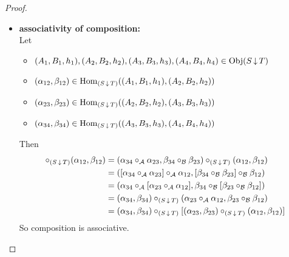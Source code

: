 \documentclass{book}
\begin{document}
\begin{proof}
\begin{itemize}
\begin{align*}
				& = h_3 \circ_{\MC} (S(\al_{23}) \circ_{\MC} S(\al_{12})) \\
				& = h_3 \circ_{\MC} S(\al_{23} \circ_{\MA} \al_{12})
			\end{align*}
			i.e. the following diagram commutes:
			\[ 
			\begin{tikzcd}
				S(A_1) \arrow[rr, "S(\al_{23} \circ_{\MA} \al_{12})"] \arrow[d, "h_1"']&  & S(A_3)  \arrow[d, "h_3"] \\
				T(B_1) \arrow[rr, "T(\be_{23} \circ_{\MB} \be_{12})"']                       &  & T(B_3)
			\end{tikzcd}
			\]
			Hence $(\al_{23} \circ_{\MA} \al_{12}, \be_{23} \circ_{\MB} \be_{12}) \in \Hom_{(S \doar T)}((A_1, B_1, h_1), (A_3, B_3, h_3))$ and composition is well defined. \\
			\item \textbf{associativity of composition:} \\
			Let 
			\begin{itemize}
				\item $(A_1, B_1, h_1), (A_2, B_2, h_2), (A_3, B_3, h_3), (A_4, B_4, h_4) \in \operatorname{Obj}(S \operatorname{\downarrow} T)$
				\item $(\alpha_{12}, \beta_{12}) \in \operatorname{Hom}_{(S \operatorname{\downarrow} T)}((A_1, B_1, h_1), (A_2, B_2, h_2))$ 
				\item $(\alpha_{23}, \beta_{23}) \in \operatorname{Hom}_{(S \operatorname{\downarrow} T)}((A_2, B_2, h_2), (A_3, B_3, h_3))$
				\item $(\alpha_{34}, \beta_{34}) \in \operatorname{Hom}_{(S \operatorname{\downarrow} T)}((A_3, B_3, h_3), (A_4, B_4, h_4))$
			\end{itemize}
			Then 
			\begin{align*}
				[ (\al_{34}, \be_{34}) \circ_{(S \doar T)} (\al_{23}, \be_{23}) ] \circ_{(S \doar T)} (\al_{12}, \be_{12})
				& = (\al_{34} \circ_{\MA} \al_{23}, \be_{34} \circ_{\MB} \be_{23}) \circ_{(S \doar T)} (\al_{12}, \be_{12}) \\
				& = ([\al_{34} \circ_{\MA} \al_{23}] \circ_{\MA} \al_{12}, [\be_{34} \circ_{\MB} \be_{23}] \circ_{\MB} \be_{12}) \\
				& =  (\al_{34} \circ_{\MA} [\al_{23} \circ_{\MA} \al_{12}], \be_{34} \circ_{\MB} [\be_{23} \circ_{\MB} \be_{12}]) \\
				& = (\al_{34}, \be_{34}) \circ_{(S \doar T)} (\al_{23} \circ_{\MA} \al_{12}, \be_{23} \circ_{\MB} \be_{12}) \\
				& = (\al_{34}, \be_{34}) \circ_{(S \doar T)} [(\al_{23}, \be_{23}) \circ_{(S \doar T)} (\al_{12}, \be_{12})]
			\end{align*}
			So composition is associative. \\

\end{itemize}
\end{proof}
\end{document}
